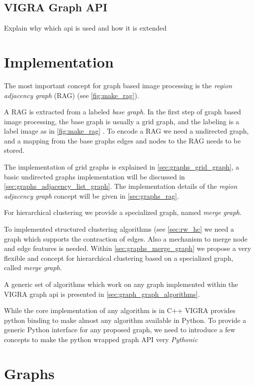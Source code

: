\subsection{VIGRA Graph API}
Explain why which api is used and how it is extended



\section{Implementation}\label{sec:vigra_graph_lib_impl}

The most important concept for graph based image processing
is the \emph{region adjacency graph} (RAG) (see \cref{fig:make_rag}).

A RAG is extracted from a labeled \emph{base graph}.
In the first step of graph based image processing, the base 
graph is usually a grid graph, and the labeling is a label image
as in \cref{fig:make_rag} .
To encode a RAG we need a undirected graph, 
and a mapping from the base graphs edges and nodes to the RAG 
needs to be stored.

The implementation of grid graphs is explained in \cref{sec:graphs_grid_graph}, 
a basic undirected graphs implementation will be discussed in \cref{sec:graphs_adjacency_list_graph}.
The implementation details of the \emph{region adjacency graph} concept will 
be given in  \cref{sec:graphs_rag}.

For hierarchical clustering we provide a specialized graph, named \emph{merge graph}.


To implemented structured clustering algorithms (see \cref{sec:rw_hc} we
need a graph which supports the contraction of edges.
Also a mechanism to merge node and edge features is needed.
Within \cref{sec:graphs_merge_graph} we propose  a very flexible
and concept for hierarchical clustering based on a specialized graph,
called \emph{merge graph}.


A generic set of algorithms which work on any graph
implemented within the VIGRA graph api is presented 
in \cref{sec:graph_graph_algorithms}.

While the core implementation of any algorithm is in C++
VIGRA provides python binding to make almost
any algorithm available in Python.
To provide a generic Python interface for any proposed
graph, we need to introduce a few concepts 
to make the python wrapped graph API very \emph{Pythonic}


\section{Graphs}


